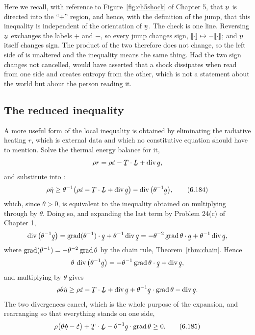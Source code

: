Here we recall, with reference to Figure~\ref{fig:ch5shock} of Chapter
5, that $\bn$ is directed into the ``$+$'' region, and hence, with the
definition  of the jump, that this inequality is independent
of the orientation of $\bn$. The check is one line. Reversing $\bn$
exchanges the labels $+$ and $-$, so every jump changes sign,
$[\![\cdot]\!]\mapsto-[\![\cdot]\!]$; and $\bn$ itself changes sign. The
product of the two therefore does not change, so the left side of
 is unaltered and the inequality means the same thing. Had
the two sign changes not cancelled,  would have asserted
that a shock dissipates when read from one side and creates entropy
from the other, which is not a statement about the world but about the
person reading it.


\subsection*{The reduced inequality}

A more useful form of the local inequality  is obtained by
eliminating the radiative heating $r$, which is external data and which
no constitutive equation should have to mention. Solve the thermal
energy balance  for it,
\[
   \rho r=\rho\dot\eps-\bT\cdot\bL+\dvg\bq ,
\]
and substitute into :
\begin{equation}
   \rho\dot\eta\geq\theta^{-1}\big(\rho\dot\eps-\bT\cdot\bL+\dvg\bq\big)
   -\dvg\big(\theta^{-1}\bq\big),
   \tag{6.184}\label{eq:6.184}
\end{equation}
which, since $\theta>0$, is equivalent to the inequality obtained on
multiplying through by $\theta$. Doing so, and expanding the last term
by Problem 24(c) of Chapter 1,
\[
   \dvg\big(\theta^{-1}\bq\big)
   =\ip{\grad(\theta^{-1})}\bq+\theta^{-1}\dvg\bq
   =-\theta^{-2}\ip{\grad\theta}\bq+\theta^{-1}\dvg\bq ,
\]
where $\operatorname{grad}(\theta^{-1})=-\theta^{-2}\operatorname{grad}\theta$ by the chain rule,
Theorem~\ref{thm:chain}. Hence
\[
   \theta\,\dvg\big(\theta^{-1}\bq\big)
   =-\theta^{-1}\ip{\grad\theta}\bq+\dvg\bq ,
\]
and multiplying  by $\theta$ gives
\[
   \rho\theta\dot\eta\geq\rho\dot\eps-\bT\cdot\bL+\dvg\bq
   +\theta^{-1}\ip\bq{\grad\theta}-\dvg\bq .
\]
The two divergences cancel, which is the whole purpose of the
expansion, and rearranging so that everything stands on one side,
\begin{equation}
   \rho\big(\theta\dot\eta-\dot\eps\big)+\bT\cdot\bL
   -\theta^{-1}\ip\bq{\grad\theta}\geq0 .
   \tag{6.185}\label{eq:6.185}
\end{equation}

